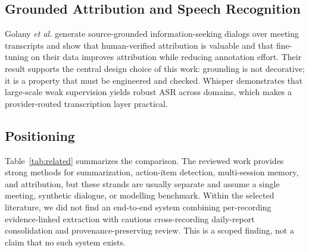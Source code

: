 \documentclass[conference,a4paper]{IEEEtran}
\newcommand{\etal}{\textit{et al.}}
\begin{document}
\subsection{Grounded Attribution and Speech Recognition}

Golany \etal \cite{golany2024mised} generate source-grounded information-seeking dialogs
over meeting transcripts and show that human-verified attribution is valuable and that
fine-tuning on their data improves attribution while reducing annotation effort. Their
result supports the central design choice of this work: grounding is not decorative; it is
a property that must be engineered and checked. Whisper \cite{radford2023whisper}
demonstrates that large-scale weak supervision yields robust ASR across domains, which
makes a provider-routed transcription layer practical.

\subsection{Positioning}

Table~\ref{tab:related} summarizes the comparison. The reviewed work provides strong
methods for summarization, action-item detection, multi-session memory, and attribution,
but these strands are usually separate and assume a single meeting, synthetic dialogue, or
modelling benchmark. Within the selected literature, we did not find an end-to-end system
combining per-recording evidence-linked extraction with cautious cross-recording
daily-report consolidation and provenance-preserving review. This is a scoped finding, not
a claim that no such system exists.
\end{document}
